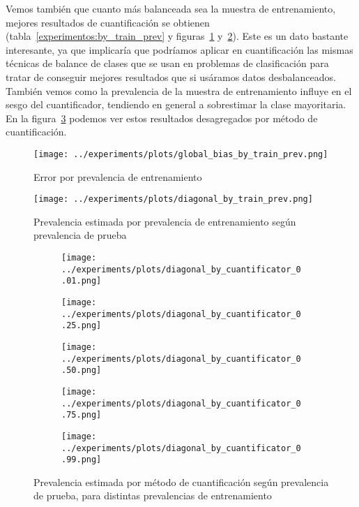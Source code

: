 Vemos también que cuanto más balanceada sea la muestra de entrenamiento, mejores
resultados de cuantificación se obtienen (tabla~\ref{experimentos:by_train_prev}
y figuras~\ref{fig:global_bias_by_train_prev}
y~\ref{fig:diagonal_by_train_prev}). Este es un dato bastante interesante, ya
que implicaría que podríamos aplicar en cuantificación las mismas técnicas de
balance de clases que se usan en problemas de clasificación para tratar de
conseguir mejores resultados que si usáramos datos desbalanceados. También vemos
como la prevalencia de la muestra de entrenamiento influye en el sesgo del
cuantificador, tendiendo en general a sobrestimar la clase mayoritaria. En la
figura~\ref{fig:diagonal_by_quantifier_by_train_prev} podemos ver estos
resultados desagregados por método de cuantificación.

\begin{figure}[!tph]
    \centering
    \centerline{\texttt{[image: ../experiments/plots/global\_bias\_by\_train\_prev.png]}}
    \caption{Error por prevalencia de
    entrenamiento}\label{fig:global_bias_by_train_prev}
\end{figure}
\begin{figure}[!tph]
    \centering
    \centerline{\texttt{[image: ../experiments/plots/diagonal\_by\_train\_prev.png]}}
    \caption{Prevalencia estimada por prevalencia de entrenamiento según
    prevalencia de prueba}\label{fig:diagonal_by_train_prev}
\end{figure}

\begin{figure}[H]
    \centering
    \begin{subfigure}[b]{.475\textwidth}
        \centering
        \texttt{[image: ../experiments/plots/diagonal\_by\_cuantificator\_0.01.png]}\quad
    \end{subfigure}
    \begin{subfigure}[b]{.475\textwidth}
        \centering
        \texttt{[image: ../experiments/plots/diagonal\_by\_cuantificator\_0.25.png]}\quad
    \end{subfigure}
    \medskip
    \begin{subfigure}[b]{.475\textwidth}
        \centering
        \texttt{[image: ../experiments/plots/diagonal\_by\_cuantificator\_0.50.png]}
    \end{subfigure}
    \begin{subfigure}[b]{.475\textwidth}
        \centering
        \texttt{[image: ../experiments/plots/diagonal\_by\_cuantificator\_0.75.png]}\quad
    \end{subfigure}
    \begin{subfigure}[b]{.65\textwidth}
        \centering
        \texttt{[image: ../experiments/plots/diagonal\_by\_cuantificator\_0.99.png]}
    \end{subfigure}
    \medskip
    \hfill
    \caption{Prevalencia estimada por método de cuantificación según prevalencia
    de prueba, para distintas prevalencias de
    entrenamiento}\label{fig:diagonal_by_quantifier_by_train_prev}
\end{figure}

